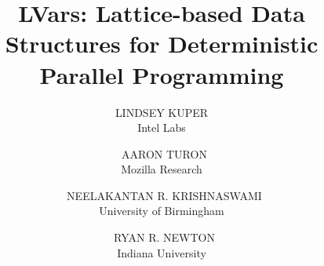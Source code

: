 \documentclass{../latex_common/jfp1}
\title{LVars: Lattice-based Data Structures for Deterministic Parallel Programming}
\author[L. Kuper, A. Turon, N. R. Krishnaswami, and R. R. Newton]
       {LINDSEY KUPER\\
          Intel Labs\\
        \and\ AARON TURON\\
          Mozilla Research\\
        \and\ NEELAKANTAN R. KRISHNASWAMI\\
          University of Birmingham\\
        \and\ RYAN R. NEWTON\\
        Indiana University}
\begin{document}
\label{firstpage}

\maketitle

\begin{abstract}

\end{abstract}







\newcommand{\myname}[0]{Kuper}

\end{document}
